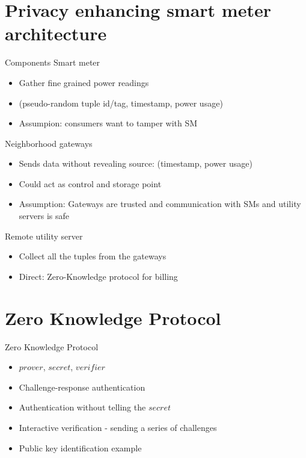 \documentclass[10pt]{beamer}
\begin{document}
\section{Privacy enhancing smart meter architecture}
\begin{frame}{Components}
  Smart meter
  \begin{itemize}
  \item Gather fine grained power readings
  \item (pseudo-random tuple id/tag, timestamp, power usage)
  \item Assumpion: consumers want to tamper with SM
  \end{itemize}
  \pause
  Neighborhood gateways
  \begin{itemize}
  \item Sends data without revealing source: (timestamp, power usage)
  \item Could act as control and storage point
  \item Assumption: Gateways are trusted and communication with SMs and utility servers is safe
  \end{itemize}
  \pause
  Remote utility server
  \begin{itemize}
  \item Collect all the tuples from the gateways
  \item Direct: Zero-Knowledge protocol for billing
  \end{itemize}
\end{frame}


\section{Zero Knowledge Protocol}
\begin{frame}{Zero Knowledge Protocol}
  \begin{itemize}
  \item $prover$, $secret$, $verifier$
  \item Challenge-response authentication
  \item Authentication without telling the $secret$
  \item Interactive verification - sending a series of challenges
  \item Public key identification example
  \end{itemize}
\end{frame}
\end{document}
